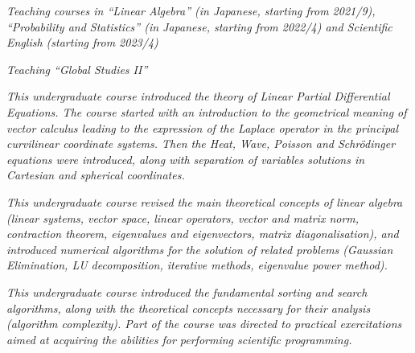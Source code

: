 \documentclass[helvetica,narrow,openbib,notitle,noflag, nologo]{europecv}
\begin{document}
\begin{europecv}
\ecvitem{} {\it Teaching courses in ``Linear Algebra'' (in Japanese, starting from 2021/9), ``Probability and Statistics'' (in Japanese, starting from 2022/4) and Scientific English (starting from 2023/4)}

\ecvitem{} {\it Teaching ``Global Studies II''}

\ecvitem{} {\it This undergraduate course introduced the theory of Linear Partial Differential Equations. The course started with an introduction to the geometrical 
meaning of vector calculus leading to the expression of the Laplace operator in the principal curvilinear coordinate systems. Then the Heat, Wave, Poisson and Schr\"odinger equations were introduced, along with separation of variables 
solutions in Cartesian and spherical coordinates.}

\ecvitem{} {\it This undergraduate course revised the main theoretical concepts of linear algebra (linear systems, vector space, linear operators, vector and matrix norm,
contraction theorem, eigenvalues and eigenvectors, matrix diagonalisation), and introduced numerical algorithms for the solution of related problems (Gaussian Elimination,
LU decomposition, iterative methods, eigenvalue power method).\\}

\ecvitem{} {\it This undergraduate course introduced the fundamental sorting and search algorithms, along with the theoretical concepts necessary for
their analysis (algorithm complexity). Part of the course was directed to practical exercitations aimed at acquiring the abilities for performing scientific programming.\\}


\end{europecv}
\end{document}
